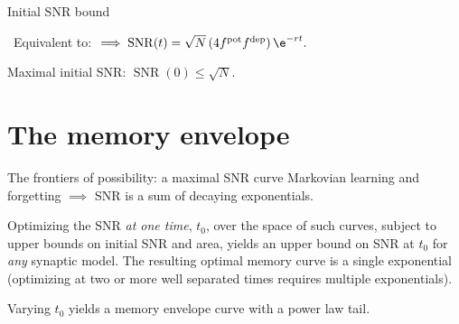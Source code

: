 \documentclass[final,hyperref={pdfpagelabels=false,bookmarks=false}]{beamer}
\DeclareMathOperator{\snr}{SNR}
\newcommand{\pot}{^\text{pot}}
\newcommand{\dep}{^\text{dep}}
\begin{document}
\begin{frame}{}
\begin{columns}[t]
\begin{column}{0.32\linewidth}
\begin{block}{Initial SNR bound}
\begin{center}
   \hspace{2cm}
  \lto\ Equivalent to:
   \hspace{1cm}
   $\implies\snr(t)=\sqrt{N}\,(4 f\pot f\dep)\,\e^{-rt}.$
  \end{center}

 \vp Maximal initial SNR:\hspace{2cm}
 $
   \snr(0) \leq \sqrt{N}.
 $
%
\end{block}


\section{The memory envelope}



\begin{block}{The frontiers of possibility: a maximal SNR curve}
%
 Markovian learning and forgetting $\implies$ SNR is a sum of decaying exponentials.

 \vp Optimizing the SNR \emph{at one time}, $t_0$, over the space of such curves,
 subject to upper bounds on initial SNR and area,
 yields an upper bound on SNR at $t_0$ for \emph{any} synaptic model.
 The resulting optimal memory curve is a single exponential
 (optimizing at two or more well separated times requires multiple exponentials).

 \vp Varying $t_0$ yields a memory envelope curve with a power law tail.


\end{block}
\end{column}
\end{columns}
\end{frame}
\end{document}
